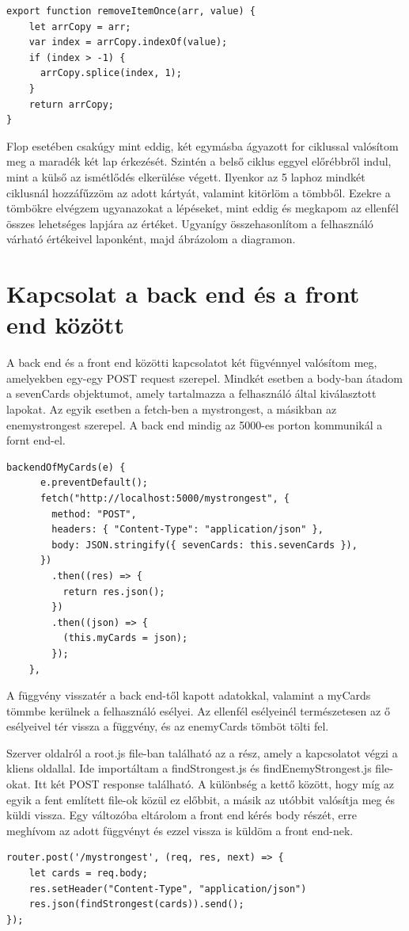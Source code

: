\begin{lstlisting}[style=htmlcssjs]
export function removeItemOnce(arr, value) {
    let arrCopy = arr;
    var index = arrCopy.indexOf(value);
    if (index > -1) {
      arrCopy.splice(index, 1);
    }
    return arrCopy;
}
\end{lstlisting}

Flop esetében csakúgy mint eddig, két egymásba ágyazott for ciklussal valósítom meg a maradék két lap érkezését. Szintén a belső ciklus eggyel előrébbről indul, mint a külső az ismétlődés elkerülése végett. Ilyenkor az 5 laphoz mindkét ciklusnál hozzáfűzzöm az adott kártyát, valamint kitörlöm a tömbből. Ezekre a tömbökre elvégzem ugyanazokat a lépéseket, mint eddig és megkapom az ellenfél összes lehetséges lapjára az értéket. Ugyanígy összehasonlítom a felhasználó várható értékeivel laponként, majd ábrázolom a diagramon.

\section{Kapcsolat a back end és a front end között}
A back end és a front end közötti kapcsolatot két fügvénnyel valósítom meg, amelyekben egy-egy POST request szerepel. Mindkét esetben a body-ban átadom a sevenCards objektumot, amely tartalmazza a felhasználó által kiválasztott lapokat. Az egyik esetben a fetch-ben a mystrongest, a másikban az enemystrongest szerepel. A back end mindig az 5000-es porton kommunikál a fornt end-el.

\begin{lstlisting}[style=htmlcssjs]
backendOfMyCards(e) {
      e.preventDefault();
      fetch("http://localhost:5000/mystrongest", {
        method: "POST",
        headers: { "Content-Type": "application/json" },
        body: JSON.stringify({ sevenCards: this.sevenCards }),
      })
        .then((res) => {
          return res.json();
        })
        .then((json) => {
          (this.myCards = json);
        });
    },
\end{lstlisting}

A függvény visszatér a back end-től kapott adatokkal, valamint a myCards tömmbe kerülnek a felhasználó esélyei. Az ellenfél esélyeinél természetesen az ő esélyeivel tér vissza a függvény, és az enemyCards tömböt tölti fel.

Szerver oldalról a root.js file-ban található az a rész, amely a kapcsolatot végzi a kliens oldallal. Ide importáltam a findStrongest.js és findEnemyStrongest.js file-okat. Itt két POST response található. A különbség a kettő között, hogy míg az egyik a fent említett file-ok közül ez előbbit, a másik az utóbbit valósítja meg és küldi vissza. Egy változóba eltárolom a front end kérés body részét, erre meghívom az adott függvényt és ezzel vissza is küldöm a front end-nek.

\begin{lstlisting}[style=htmlcssjs]
router.post('/mystrongest', (req, res, next) => {
    let cards = req.body;
    res.setHeader("Content-Type", "application/json")
    res.json(findStrongest(cards)).send();
});
\end{lstlisting}